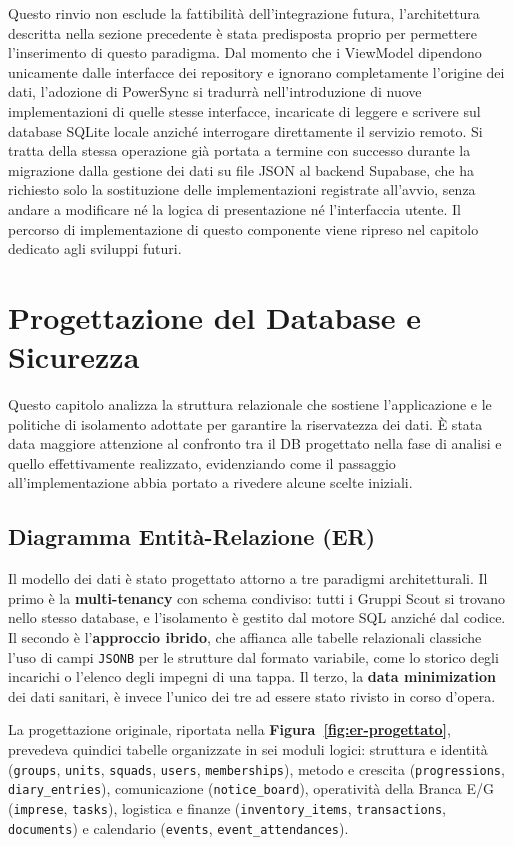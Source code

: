 \documentclass[11pt]{article}
\numberwithin{figure}{section}
\begin{document}
Questo rinvio non esclude la fattibilità dell'integrazione futura, l'architettura descritta nella sezione precedente è stata predisposta proprio per permettere l'inserimento di questo paradigma. Dal momento che i ViewModel dipendono unicamente dalle interfacce dei repository e ignorano completamente l'origine dei dati, l'adozione di PowerSync si tradurrà nell'introduzione di nuove implementazioni di quelle stesse interfacce, incaricate di leggere e scrivere sul database SQLite locale anziché interrogare direttamente il servizio remoto. Si tratta della stessa operazione già portata a termine con successo durante la migrazione dalla gestione dei dati su file JSON al backend Supabase, che ha richiesto solo la sostituzione delle implementazioni registrate all'avvio, senza andare a modificare né la logica di presentazione né l'interfaccia utente. Il percorso di implementazione di questo componente viene ripreso nel capitolo dedicato agli sviluppi futuri.


\section{Progettazione del Database e Sicurezza}


Questo capitolo analizza la struttura relazionale che sostiene l'applicazione e le politiche di isolamento adottate per garantire la riservatezza dei dati. È stata data maggiore attenzione al confronto tra il DB progettato nella fase di analisi e quello effettivamente realizzato, evidenziando come il passaggio all'implementazione abbia portato a rivedere alcune scelte iniziali.

\subsection{Diagramma Entità-Relazione (ER)}

Il modello dei dati è stato progettato attorno a tre paradigmi architetturali. Il primo è la \textbf{multi-tenancy} con schema condiviso: tutti i Gruppi Scout si trovano nello stesso database, e l'isolamento è gestito dal motore SQL anziché dal codice. Il secondo è l'\textbf{approccio ibrido}, che affianca alle tabelle relazionali classiche l'uso di campi \texttt{JSONB} per le strutture dal formato variabile, come lo storico degli incarichi o l'elenco degli impegni di una tappa. Il terzo, la \textbf{data minimization} dei dati sanitari, è invece l'unico dei tre ad essere stato rivisto in corso d'opera.

La progettazione originale, riportata nella \textbf{Figura~\ref{fig:er-progettato}}, prevedeva quindici tabelle organizzate in sei moduli logici: struttura e identità (\texttt{groups}, \texttt{units}, \texttt{squads}, \texttt{users}, \texttt{memberships}), metodo e crescita (\texttt{progressions}, \texttt{diary\_entries}), comunicazione (\texttt{notice\_board}), operatività della Branca E/G (\texttt{imprese}, \texttt{tasks}), logistica e finanze (\texttt{inventory\_items}, \texttt{transactions}, \texttt{documents}) e calendario (\texttt{events}, \texttt{event\_attendances}).
\end{document}

